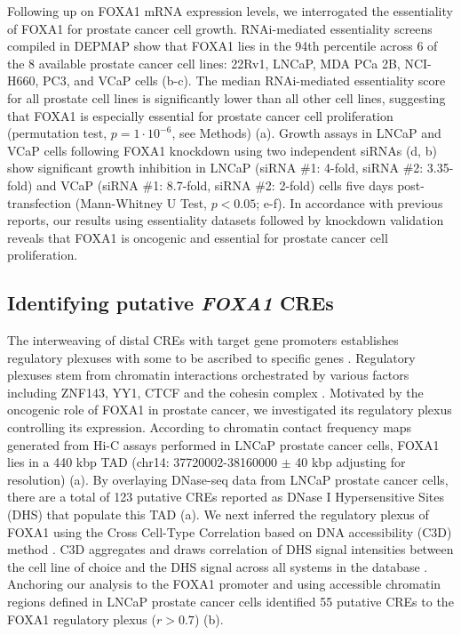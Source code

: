 Following up on FOXA1 mRNA expression levels, we interrogated the essentiality of FOXA1 for prostate cancer cell growth.
RNAi-mediated essentiality screens compiled in DEPMAP show that FOXA1 lies in the 94th percentile across 6 of the 8 available prostate cancer cell lines: 22Rv1, LNCaP, MDA PCa 2B, NCI-H660, PC3, and VCaP cells (b-c).
The median RNAi-mediated essentiality score for all prostate cell lines is significantly lower than all other cell lines, suggesting that FOXA1 is especially essential for prostate cancer cell proliferation (permutation test, $p = 1 \cdot 10^{-6}$, see Methods) (a).
Growth assays in LNCaP and VCaP cells following FOXA1 knockdown using two independent siRNAs (d, b) show significant growth inhibition in LNCaP (siRNA \#1: 4-fold, siRNA \#2: 3.35-fold) and VCaP (siRNA \#1: 8.7-fold, siRNA \#2: 2-fold) cells five days post-transfection (Mann-Whitney U Test, $p<0.05$; e-f).
In accordance with previous reports, our results using essentiality datasets followed by knockdown validation reveals that FOXA1 is oncogenic and essential for prostate cancer cell proliferation.

\subsection{Identifying putative \emph{FOXA1} CREs}

The interweaving of distal CREs with target gene promoters establishes regulatory plexuses with some to be ascribed to specific genes \cite{sallariConvergenceDispersedRegulatory2016,baileyNoncodingSomaticInherited2016}.
Regulatory plexuses stem from chromatin interactions orchestrated by various factors including ZNF143, YY1, CTCF and the cohesin complex \cite{phillipsCTCFMasterWeaver2009,weintraubYY1StructuralRegulator2017,baileyZNF143ProvidesSequence2015}.
Motivated by the oncogenic role of FOXA1 in prostate cancer, we investigated its regulatory plexus controlling its expression.
According to chromatin contact frequency maps generated from Hi-C assays performed in LNCaP prostate cancer cells, FOXA1 lies in a 440 kbp TAD (chr14: 37720002-38160000 $\pm$ 40 kbp adjusting for resolution) (a).
By overlaying DNase-seq data from LNCaP prostate cancer cells, there are a total of 123 putative CREs reported as DNase I Hypersensitive Sites (DHS) that populate this TAD (a).
We next inferred the regulatory plexus of FOXA1 using the Cross Cell-Type Correlation based on DNA accessibility (C3D) method \cite{mehdiC3DToolPredict2019}.
C3D aggregates and draws correlation of DHS signal intensities between the cell line of choice and the DHS signal across all systems in the database \cite{mehdiC3DToolPredict2019}.
Anchoring our analysis to the FOXA1 promoter and using accessible chromatin regions defined in LNCaP prostate cancer cells identified 55 putative CREs to the FOXA1 regulatory plexus ($r > 0.7$) (b).

